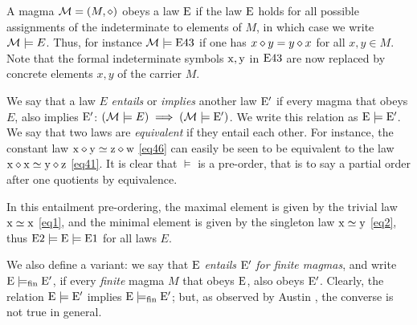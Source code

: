 A magma ${\mathcal{M}} = (M,\diamond)$ obeys a law $\mathrm{E}$ if the law $\mathrm{E}$ holds for all possible assignments of the indeterminate to elements of $M$, in which case we write ${\mathcal{M}} \models E$. Thus, for instance ${\mathcal{M}} \models \mathrm{E}43$ if one has $x \diamond y = y \diamond x$ for all $x,y \in M$.  Note that the formal indeterminate symbols $\mathrm{x}, \mathrm{y}$ in $\mathrm{E}43$ are now replaced by concrete elements $x,y$ of the carrier $M$.

We say that a law $E$ \emph{entails} or \emph{implies} another law ${\mathrm{E}'}$ if every magma that obeys $E$, also implies ${\mathrm{E}'}$: $({\mathcal{M}} \models E) \implies ({\mathcal{M}} \models {\mathrm{E}'})$.  We write this relation as ${\mathrm{E}} \models {\mathrm{E}'}$. We say that two laws are \emph{equivalent} if they entail each other. For instance, the constant law $\mathrm{x} \diamond \mathrm{y} \simeq \mathrm{z} \diamond \mathrm{w}$ \eqref{eq46} can easily be seen to be equivalent to the law $\mathrm{x} \diamond \mathrm{x} \simeq \mathrm{y} \diamond \mathrm{z}$ \eqref{eq41}.  It is clear that $\models$ is a pre-order, that is to say a partial order after one quotients by equivalence.

In this entailment pre-ordering, the maximal element is given by the trivial law $\mathrm{x}\simeq\mathrm{x}$ \eqref{eq1}, and the minimal element is given by the singleton law $\mathrm{x}\simeq \mathrm{y}$ \eqref{eq2}, thus $\mathrm{E}2 \models {\mathrm{E}} \models \mathrm{E}1$ for all laws $E$.

We also define a variant: we say that $\mathrm{E}$ \emph{entails} ${\mathrm{E}'}$ \emph{for finite magmas}, and write ${\mathrm{E}} \models_{\mathrm{fin}} {\mathrm{E}'}$, if every \emph{finite} magma $M$ that obeys $\mathrm{E}$, also obeys ${\mathrm{E}'}$.  Clearly, the relation ${\mathrm{E}} \models {\mathrm{E}'}$ implies ${\mathrm{E}} \models_{\mathrm{fin}} {\mathrm{E}'}$; but, as observed by Austin \cite{austin_finite}, the converse is not true in general.

